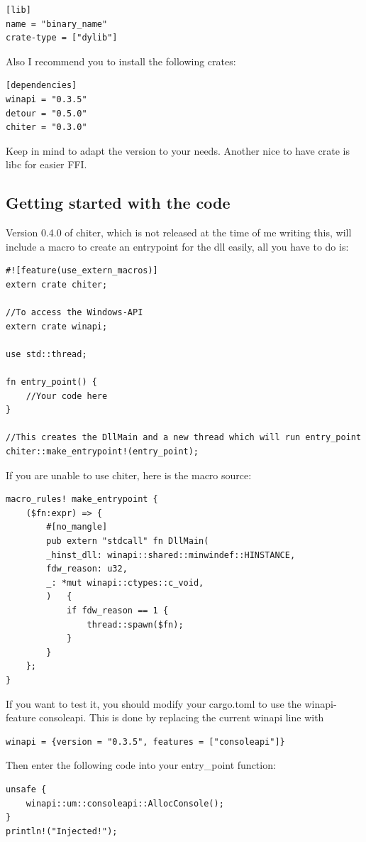 \documentclass[]{scrartcl}
\begin{document}
\begin{verbatim}
[lib]
name = "binary_name"
crate-type = ["dylib"]
\end{verbatim}
\noindent
Also I recommend you to install the following crates:

\begin{verbatim}
[dependencies]
winapi = "0.3.5"
detour = "0.5.0"
chiter = "0.3.0"
\end{verbatim}
\noindent
Keep in mind to adapt the version to your needs. Another nice to have crate is libc for easier FFI.
\newpage
\subsection{Getting started with the code}

Version 0.4.0 of chiter, which is not released at the time of me writing this, will include a macro to create an entrypoint for the dll easily, all you have to do is:

\begin{verbatim}
#![feature(use_extern_macros)]
extern crate chiter;

//To access the Windows-API
extern crate winapi;

use std::thread;

fn entry_point() {
	//Your code here
}

//This creates the DllMain and a new thread which will run entry_point
chiter::make_entrypoint!(entry_point);
\end{verbatim}

\noindent
If you are unable to use chiter, here is the macro source:

\begin{verbatim}
macro_rules! make_entrypoint {
	($fn:expr) => {
		#[no_mangle]
		pub extern "stdcall" fn DllMain(
		_hinst_dll: winapi::shared::minwindef::HINSTANCE,
		fdw_reason: u32,
		_: *mut winapi::ctypes::c_void,
		)	{
			if fdw_reason == 1 {
				thread::spawn($fn);
			}
		}
	};
}
\end{verbatim}
\noindent
If you want to test it, you should modify your cargo.toml to use the winapi-feature consoleapi. This is done by replacing the current winapi line with

\begin{verbatim}
winapi = {version = "0.3.5", features = ["consoleapi"]}
\end{verbatim}
\noindent
Then enter the following code into your entry\_point function:
\newline
\begin{verbatim}
unsafe {
	winapi::um::consoleapi::AllocConsole();
}
println!("Injected!");
\end{verbatim}
\end{document}

